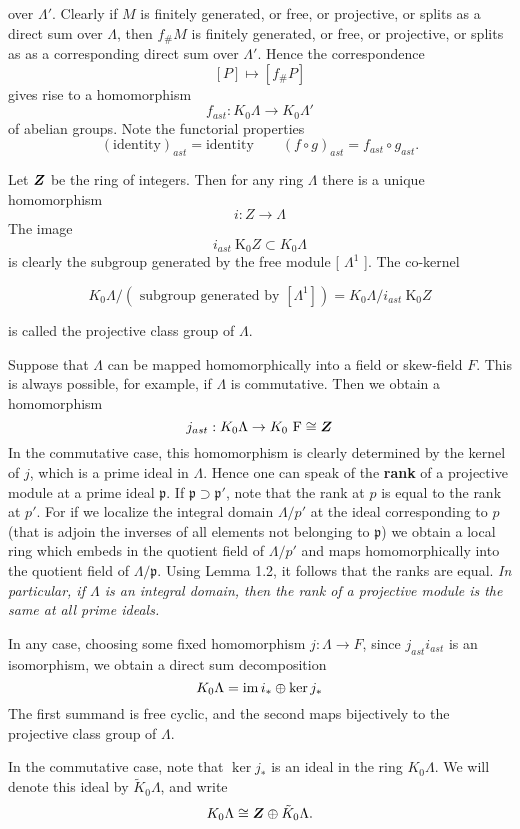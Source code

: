 over $\Lambda'$. Clearly if $M$ is finitely generated, or free, or projective, or splits as a direct sum over $\Lambda$, then $f_{\#} M$ is finitely generated, or free, or projective, or splits as as a corresponding direct sum over $\Lambda'$. Hence the correspondence
\[
[P] \mapsto\left[f_{\#} P\right]
\]
gives rise to a homomorphism
\[
f_{ast}: K_{0} \Lambda \to K_{0} \Lambda'
\]
of abelian groups. Note the functorial properties
\[
(\text{identity})_{ast}=\text{identity} \qquad (f \circ g)_{ast}=f_{ast} \circ g_{ast}.
\]

\begin{exmp}\label{ex:1.1}
	Let $\bm{Z}$ be the ring of integers. Then for any ring $\Lambda$ there is a unique homomorphism
	\[
		i: Z \to \Lambda
	\]
	The image
	\[
		i_{ast} \mathrm{~K}_{0} Z \subset K_{0} \Lambda
	\]
	is clearly the subgroup generated by the free module [ $\Lambda^{1}$ ]. The co-kernel

	\[
	K_{0} \Lambda /\left(\text { subgroup generated by }\left[\Lambda^{1}\right]\right)=K_{0} \Lambda / i_{ast} \mathrm{~K}_{0} Z
	\]

	is called the projective class group of $\Lambda$.
\end{exmp}

\begin{exmp}\label{ex:1.2}
	Suppose that $\Lambda$ can be mapped homomorphically into a field or skew-field $F$. This is always possible, for example, if $\Lambda$ is commutative. Then we obtain a homomorphism
	\[
		j_{ast}: K_{0} \Lambda \to K_{0} \mathrm{~F} \cong \bm{Z}
	\]
	In the commutative case, this homomorphism is clearly determined by the kernel of $j$, which is a prime ideal in $\Lambda$. Hence one can speak of the \textbf{rank} of a projective module at a prime ideal $\mathfrak{p}$. If $\mathfrak{p} \supset \mathfrak{p}'$, note that the rank at $p$ is equal to the rank at $p'$. For if we localize the integral domain $\Lambda / p'$ at the ideal corresponding to $p$ (that is adjoin the inverses of all elements not belonging to $\mathfrak{p}$) we obtain a local ring which embeds in the quotient field of $\Lambda / p'$ and maps homomorphically into the quotient field of $\Lambda / \mathfrak{p}$. Using Lemma 1.2, it follows that the ranks are equal. \textit{In particular, if $\Lambda$ is an integral domain, then the rank of a projective module is the same at all prime ideals.}

	In any case, choosing some fixed homomorphism $j: \Lambda \to F$, since $j_{ast} i_{ast}$ is an isomorphism, we obtain a direct sum decomposition
	\[
		K_{0} \Lambda= \operatorname{im} i_\ast \oplus \ker j_\ast
	\]
	The first summand is free cyclic, and the second maps bijectively to the projective class group of $\Lambda$.

	In the commutative case, note that $\ker j_\ast $ is an ideal in the ring $K_{0} \Lambda$. We will denote this ideal by $\tilde{K}_{0} \Lambda$, and write
	\[
		K_{0} \Lambda \cong \bm{Z} \oplus \tilde{K}_{0} \Lambda.
	\]
\end{exmp}

